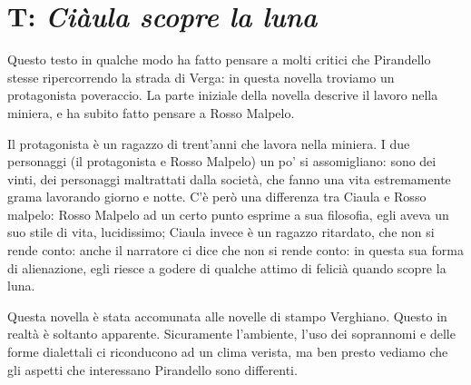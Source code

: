\chapter{T: \textit{Ciàula scopre la luna}}

Questo testo in qualche modo ha fatto pensare a molti critici che Pirandello stesse ripercorrendo la strada di Verga: in questa novella troviamo un protagonista poveraccio.
La parte iniziale della novella descrive il lavoro nella miniera, e ha subito fatto pensare a Rosso Malpelo.

Il protagonista è un ragazzo di trent'anni che lavora nella miniera. I due personaggi (il protagonista e Rosso Malpelo) un po' si assomigliano: sono dei vinti, dei personaggi maltrattati dalla società, che fanno una vita estremamente grama lavorando giorno e notte.
C'è però una differenza tra Ciaula e Rosso malpelo: Rosso Malpelo ad un certo punto esprime a sua filosofia, egli aveva un suo stile di vita, lucidissimo; Ciaula invece è un ragazzo ritardato, che non si rende conto: anche il narratore ci dice che non si rende conto: in questa sua forma di alienazione, egli riesce a godere di qualche attimo di felicià quando scopre la luna.

Questa novella è stata accomunata alle novelle di stampo Verghiano.
Questo in realtà è soltanto apparente. Sicuramente l'ambiente, l'uso dei soprannomi e delle forme dialettali ci riconducono ad un clima verista, ma ben presto vediamo che gli aspetti che interessano Pirandello sono differenti.



